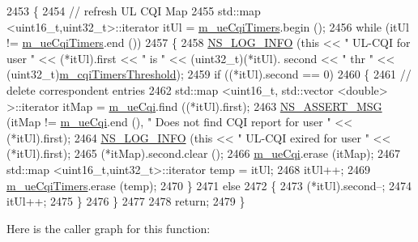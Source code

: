 \begin{DoxyCode}
2453 \{
2454   \textcolor{comment}{// refresh UL CQI  Map}
2455   std::map <uint16\_t,uint32\_t>::iterator itUl = \hyperlink{classns3_1_1PssFfMacScheduler_a1cc9115fabab47bd1c6de8fa20725782}{m\_ueCqiTimers}.begin ();
2456   \textcolor{keywordflow}{while} (itUl != \hyperlink{classns3_1_1PssFfMacScheduler_a1cc9115fabab47bd1c6de8fa20725782}{m\_ueCqiTimers}.end ())
2457     \{
2458       \hyperlink{group__logging_gafbd73ee2cf9f26b319f49086d8e860fb}{NS\_LOG\_INFO} (\textcolor{keyword}{this} << \textcolor{stringliteral}{" UL-CQI for user "} << (*itUl).first << \textcolor{stringliteral}{" is "} << (uint32\_t)(*itUl).
      second << \textcolor{stringliteral}{" thr "} << (uint32\_t)\hyperlink{classns3_1_1PssFfMacScheduler_a56d836fa470b6d79eca2b03258325373}{m\_cqiTimersThreshold});
2459       \textcolor{keywordflow}{if} ((*itUl).second == 0)
2460         \{
2461           \textcolor{comment}{// delete correspondent entries}
2462           std::map <uint16\_t, std::vector <double> >::iterator itMap = \hyperlink{classns3_1_1PssFfMacScheduler_abd1f917911a86bfd576e93ec67d7b8b2}{m\_ueCqi}.find ((*itUl).first);
2463           \hyperlink{assert_8h_aff5ece9066c74e681e74999856f08539}{NS\_ASSERT\_MSG} (itMap != \hyperlink{classns3_1_1PssFfMacScheduler_abd1f917911a86bfd576e93ec67d7b8b2}{m\_ueCqi}.end (), \textcolor{stringliteral}{" Does not find CQI report for user "}
       << (*itUl).first);
2464           \hyperlink{group__logging_gafbd73ee2cf9f26b319f49086d8e860fb}{NS\_LOG\_INFO} (\textcolor{keyword}{this} << \textcolor{stringliteral}{" UL-CQI exired for user "} << (*itUl).first);
2465           (*itMap).second.clear ();
2466           \hyperlink{classns3_1_1PssFfMacScheduler_abd1f917911a86bfd576e93ec67d7b8b2}{m\_ueCqi}.erase (itMap);
2467           std::map <uint16\_t,uint32\_t>::iterator temp = itUl;
2468           itUl++;
2469           \hyperlink{classns3_1_1PssFfMacScheduler_a1cc9115fabab47bd1c6de8fa20725782}{m\_ueCqiTimers}.erase (temp);
2470         \}
2471       \textcolor{keywordflow}{else}
2472         \{
2473           (*itUl).second--;
2474           itUl++;
2475         \}
2476     \}
2477 
2478   \textcolor{keywordflow}{return};
2479 \}
\end{DoxyCode}


Here is the caller graph for this function\+:


